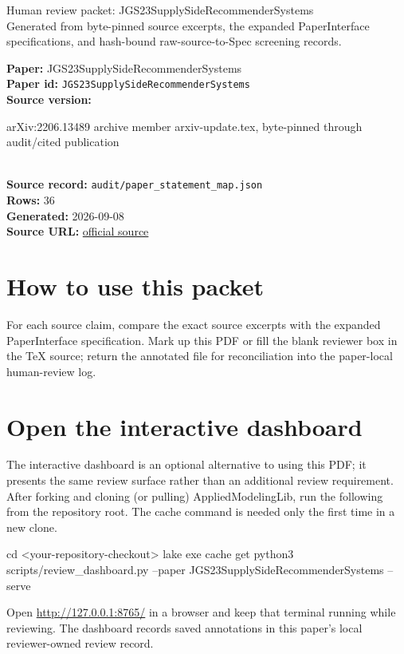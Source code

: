 \documentclass[10pt]{article}
\begin{document}
\fontsize{9}{10}\selectfont

\begin{center}
{\LARGE Human review packet: JGS23SupplySideRecommenderSystems}\\[0.35em]
\small Generated from byte-pinned source excerpts, the expanded PaperInterface
specifications, and hash-bound raw-source-to-Spec screening records.
\end{center}

\noindent\textbf{Paper:} JGS23SupplySideRecommenderSystems\\
\textbf{Paper id:} \texttt{JGS23SupplySideRecommenderSystems}\\
\textbf{Source version:} \parbox[t]{0.76\linewidth}{\raggedright arXiv:2206.13489 archive member arxiv-update.tex, byte-pinned through audit/cited publication}\\
\textbf{Source record:} \texttt{audit/paper\_statement\_map.json}\\
\textbf{Rows:} 36\\
\textbf{Generated:} 2026-09-08\\
\textbf{Source URL:} \href{https://arxiv.org/abs/2206.13489}{official source}





\section*{How to use this packet}
For each source claim, compare the exact source excerpts with the expanded
PaperInterface specification. Mark up this PDF or fill the blank reviewer box in the TeX source;
return the annotated file for reconciliation into the paper-local human-review
log.

\section*{Open the interactive dashboard}
The interactive dashboard is an optional alternative to using this PDF; it
presents the same review surface rather than an additional review requirement.
After forking and cloning (or pulling) AppliedModelingLib, run the following from the
repository root. The cache command is needed only the first time in a new clone.
\begin{ReviewVerbatim}
cd <your-repository-checkout>
lake exe cache get
python3 scripts/review_dashboard.py --paper JGS23SupplySideRecommenderSystems --serve
\end{ReviewVerbatim}
Open \url{http://127.0.0.1:8765/} in a browser and keep that terminal running
while reviewing. The dashboard records saved annotations in this paper's local
reviewer-owned review record.
\end{document}
